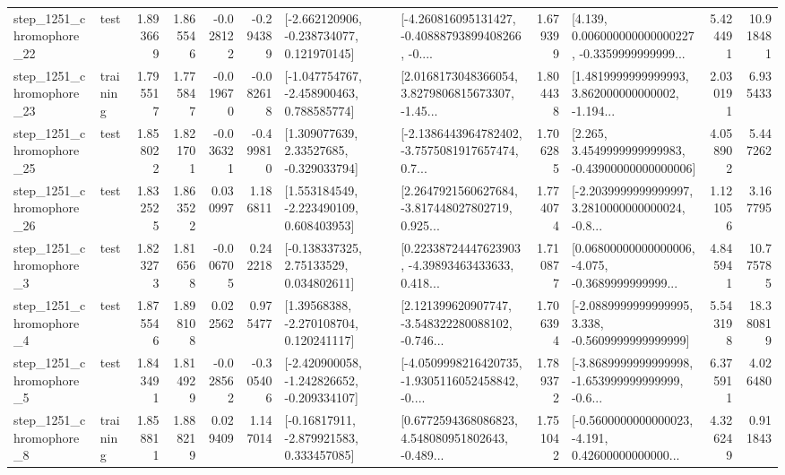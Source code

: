 \begin{tabular}{llrrrrllrlrr}
 step\_1251\_chromophore\_22 &      test &      1.893669 &    1.865546 &     -0.028122 & -0.294389 &   [-2.662120906, -0.238734077, 0.121970145] &  [-4.260816095131427, -0.40888793899408266, -0.... &       1.679399 &  [4.139, 0.006000000000000227, -0.3359999999999... &            5.424491 &         10.918481 \\
 step\_1251\_chromophore\_23 &  training &      1.795517 &    1.775847 &     -0.019670 & -0.082618 &   [-1.047754767, -2.458900463, 0.788585774] &  [2.0168173048366054, 3.8279806815673307, -1.45... &       1.804438 &  [1.4819999999999993, 3.862000000000002, -1.194... &            2.030191 &          6.935433 \\
 step\_1251\_chromophore\_25 &      test &      1.858022 &    1.821701 &     -0.036321 & -0.499810 &     [1.309077639, 2.33527685, -0.329033794] &  [-2.1386443964782402, -3.7575081917657474, 0.7... &       1.706285 &  [2.265, 3.4549999999999983, -0.43900000000000006] &            4.058902 &          5.447262 \\
 step\_1251\_chromophore\_26 &      test &      1.832525 &    1.863522 &      0.030997 &  1.186811 &    [1.553184549, -2.223490109, 0.608403953] &  [2.2647921560627684, -3.817448027802719, 0.925... &       1.774074 &  [-2.2039999999999997, 3.2810000000000024, -0.8... &            1.121056 &          3.167795 \\
  step\_1251\_chromophore\_3 &      test &      1.823273 &    1.816568 &     -0.006705 &  0.242218 &     [-0.138337325, 2.75133529, 0.034802611] &  [0.22338724447623903, -4.39893463433633, 0.418... &       1.710877 &  [0.06800000000000006, -4.075, -0.3689999999999... &            4.845941 &         10.775785 \\
  step\_1251\_chromophore\_4 &      test &      1.875546 &    1.898108 &      0.022562 &  0.975477 &     [1.39568388, -2.270108704, 0.120241117] &  [2.121399620907747, -3.548322280088102, -0.746... &       1.706394 &  [-2.0889999999999995, 3.338, -0.5609999999999999] &            5.543198 &         18.380819 \\
  step\_1251\_chromophore\_5 &      test &      1.843491 &    1.814929 &     -0.028562 & -0.305406 &  [-2.420900058, -1.242826652, -0.209334107] &  [-4.0509998216420735, -1.9305116052458842, -0.... &       1.789372 &  [-3.8689999999999998, -1.653999999999999, -0.6... &            6.375911 &          4.026480 \\
  step\_1251\_chromophore\_8 &  training &      1.858811 &    1.888219 &      0.029409 &  1.147014 &    [-0.16817911, -2.879921583, 0.333457085] &  [0.6772594368086823, 4.548080951802643, -0.489... &       1.751042 &  [-0.5600000000000023, -4.191, 0.42600000000000... &            4.326249 &          0.911843 \\

\end{tabular}
